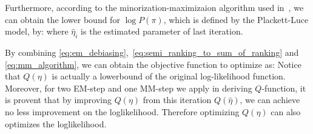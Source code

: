 

Furthermore, according to the minorization-maximizaion algorithm used in~\cite{hunter:aos2004},
we can obtain the lower bound for $\log P(\pi)$, which is defined by the Plackett-Luce model, by:
%
where $\hat{\eta}_i$ is the estimated parameter of last iteration.



By combining \eqref{eq:em_debiasing},~\eqref{eq:semi_ranking_to_sum_of_ranking} and \eqref{eq:mm_algorithm},
we can obtain the objective function to optimize as:
%
Notice that $Q(\eta)$ is actually a lowerbound of the original log-likelihood function.
Moreover, for two EM-step and one MM-step we apply in deriving $Q$-function,
it is provent that by improving $Q(\eta)$ from this iteration $Q(\hat{\eta})$,
we can achieve no less improvement on the loglikelihood.
Therefore optimizing $Q(\eta)$ can also optimizes the loglikelihood.



